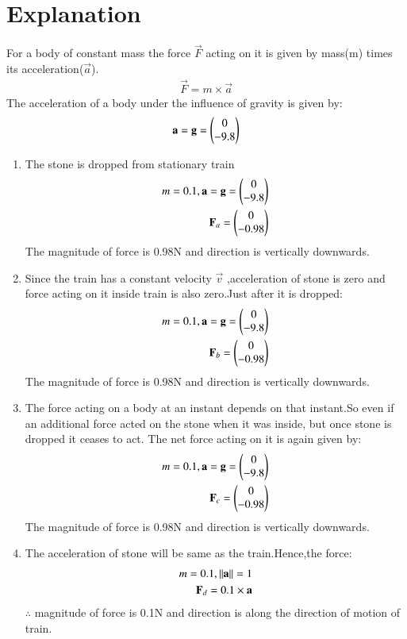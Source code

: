 \documentclass[journal,12pt,twocolumn]{IEEEtran}
\begin{document}
\section{Explanation}
For a body of constant mass the force $\vec{F}$ acting on it is given by mass(m) times its acceleration($\vec{a}$).
\begin{align}
    \vec{F}=m\times\vec{a}
\end{align}
The acceleration of a body under the influence of gravity is given by:
\begin{align}
    \mathbf{a}=\mathbf{g}=\begin{pmatrix}0\\-9.8\end{pmatrix}
\end{align}
\begin{enumerate}[label=(\alph*)]
    \item The stone is dropped from stationary train
    \begin{align}
        m=0.1,
        \mathbf{a}=\mathbf{g}=\begin{pmatrix}0\\-9.8\end{pmatrix}\\
        \mathbf{F}_{a}=\begin{pmatrix}0\\-0.98\end{pmatrix}\\
        \end{align}
   The magnitude of force is 0.98N and direction is vertically downwards. 
   
   \item
   Since the train has a constant velocity $\vec{v}$ ,acceleration of stone is zero and force acting on it inside train is also zero.Just after it is dropped:
   \begin{align}
        m=0.1,
        \mathbf{a}=\mathbf{g}=\begin{pmatrix}0\\-9.8\end{pmatrix}\\
        \mathbf{F}_{b}=\begin{pmatrix}0\\-0.98\end{pmatrix}
        \end{align}
   The magnitude of force is 0.98N and direction is vertically downwards. 
   \item
  The force acting on a body at an instant depends on that instant.So even if an additional force acted on the stone when it was inside,
   but once stone is dropped it ceases to act. The net force acting on it is again given by:
   \begin{align}
        m=0.1,
        \mathbf{a}=\mathbf{g}=\begin{pmatrix}0\\-9.8\end{pmatrix}\\
        \mathbf{F}_{c}=\begin{pmatrix}0\\-0.98\end{pmatrix}
        \end{align}
    The magnitude of force is 0.98N and direction is vertically downwards.
    \item The acceleration of stone will be same as the train.Hence,the force:
    \begin{align}
        m=0.1,
        \Vert\mathbf{a}\rVert=1\\
        \mathbf{F}_{d}=0.1\times\mathbf{a}
        \end{align}
    $\therefore$ magnitude of force is 0.1N and direction is along the direction of motion of train.
\end{enumerate}
\end{document}
